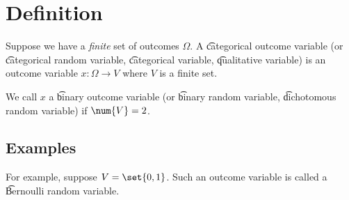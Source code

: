 

\section*{Definition}

Suppose we have a \textit{finite} set of outcomes $\Omega $.
A \t{categorical outcome variable} (or \t{categorical random variable}, \t{categorical variable}, \t{qualitative variable}) is an outcome variable $x: \Omega  \to V$ where $V$ is a finite set.

We call $x$ a \t{binary outcome variable} (or \t{binary random variable}, \t{dichotomous random variable}) if $\num{V} = 2$.

\subsection*{Examples}

For example, suppose $V = \set{0,1}$.
Such an outcome variable is called a \t{Bernoulli random variable}.

\blankpage